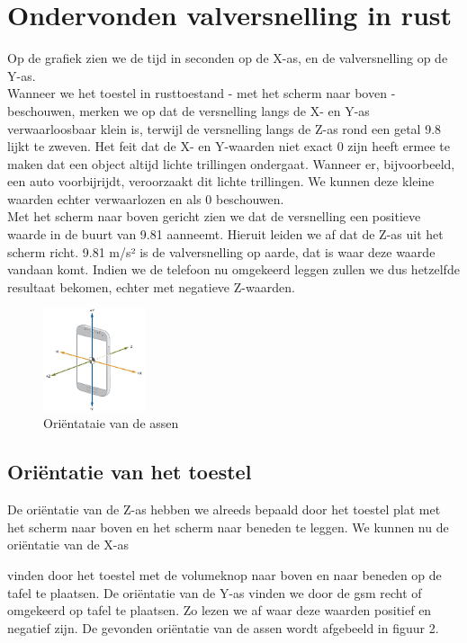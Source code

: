 \documentclass{article}
\begin{document}
\section{Ondervonden valversnelling in rust}
Op de grafiek zien we de tijd in seconden op de X-as, en de valversnelling op de Y-as. \\
Wanneer we het toestel in rusttoestand - met het scherm naar boven - beschouwen, merken we op dat de versnelling langs de X- en Y-as verwaarloosbaar klein is, terwijl de versnelling langs de Z-as rond een getal 9.8 lijkt te zweven. Het feit dat de X- en Y-waarden niet exact 0 zijn heeft ermee te maken dat een object altijd lichte trillingen ondergaat. Wanneer er, bijvoorbeeld, een auto voorbijrijdt, veroorzaakt dit lichte trillingen. We kunnen deze kleine waarden echter verwaarlozen en als 0 beschouwen. 
\\Met het scherm naar boven gericht zien we dat de versnelling een positieve waarde in de buurt van 9.81 aanneemt. Hieruit leiden we af dat de Z-as uit het scherm richt. 9.81 m/s² is de valversnelling op aarde, dat is waar deze waarde vandaan komt. Indien we de telefoon nu omgekeerd leggen zullen we dus hetzelfde resultaat bekomen, echter met negatieve Z-waarden. 
\begin{figure}
    \label{wrap-fig:2}
    \includegraphics[width=3.0cm]{figures/andereAfb/assenstelsel.JPG}
    \caption{Oriëntataie van de assen}
\end{figure}


\subsection{Oriëntatie van het toestel}

De oriëntatie van de Z-as hebben we alreeds bepaald door het toestel plat met het scherm naar boven en het scherm naar beneden te leggen. We kunnen nu de oriëntatie van de X-as 

vinden door het toestel met de volumeknop naar boven en naar beneden op de tafel te plaatsen. De oriëntatie van de Y-as vinden we door de gsm recht of omgekeerd op tafel te plaatsen. Zo lezen we af waar deze waarden positief en negatief zijn. De gevonden oriëntatie van de assen wordt afgebeeld in figuur 2.
\end{document}
